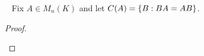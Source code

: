 \documentclass{article}
\begin{document}
\begin{problem}{2} ~
  Fix $A \in M_n(K)$ and let $C(A) = \left\{ B : BA = AB \right\}$.
\end{problem}

\begin{proof} ~
  \begin{enumerate}[(a)]

\end{enumerate}
\end{proof}
\end{document}
